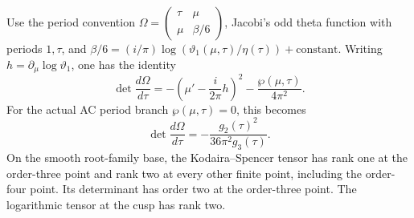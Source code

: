 
\begin{proposition}\label{cdp:st:E8}
Use the period convention
$\Omega=\left(\begin{smallmatrix}\tau&\mu\\\mu&\beta/6\end{smallmatrix}\right)$,
Jacobi's odd theta function with periods $1,\tau$, and
$\beta/6=(i/\pi)\log(\vartheta_1(\mu,\tau)/\eta(\tau))+\text{constant}$.
Writing $h=\partial_\mu\log\vartheta_1$, one has the identity
\begin{equation}\label{cdp:eq:E-theta-general}
 \det\frac{d\Omega}{d\tau}
 =-\left(\mu'-\frac{i}{2\pi}h\right)^2
       -\frac{\wp(\mu,\tau)}{4\pi^2}.
\end{equation}
For the actual AC period branch $\wp(\mu,\tau)=0$, this becomes
\[
 \det\frac{d\Omega}{d\tau}
       =-\frac{g_2(\tau)^2}{36\pi^2g_3(\tau)}.
\]
On the smooth root-family base, the Kodaira--Spencer tensor has rank
one at the order-three point and rank two at every other finite
point, including the order-four point. Its determinant has order
two at the order-three point. The logarithmic tensor at the cusp
has rank two.
\end{proposition}
